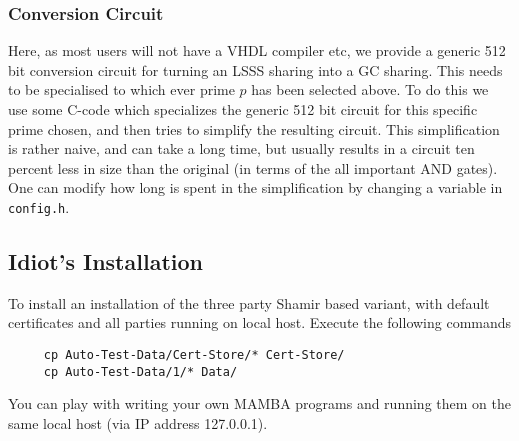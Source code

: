 \subsubsection{Conversion Circuit}
Here, as most users will not have a VHDL compiler etc, we provide
a generic 512 bit conversion circuit for turning an LSSS sharing
into a GC sharing.
This needs to be specialised to which ever prime $p$ has been selected above.
To do this we use some C-code  which specializes the generic 512
bit circuit for this specific prime chosen, and then tries
to simplify the resulting circuit. This simplification is rather
naive, and can take a long time, but usually results in a circuit ten percent
less in size than the original (in terms of the all important AND gates).
One can modify how long is spent in the simplification by
changing a variable in \verb+config.h+.

\subsection{Idiot's Installation}
\label{sec:idiot}
To install an installation of the three party Shamir based
variant, with default certificates and all parties running
on local host.
Execute the following commands
\begin{verbatim}
     cp Auto-Test-Data/Cert-Store/* Cert-Store/
     cp Auto-Test-Data/1/* Data/
\end{verbatim}
You can play with writing your own MAMBA programs and
running them on the same local host (via IP address
127.0.0.1).
